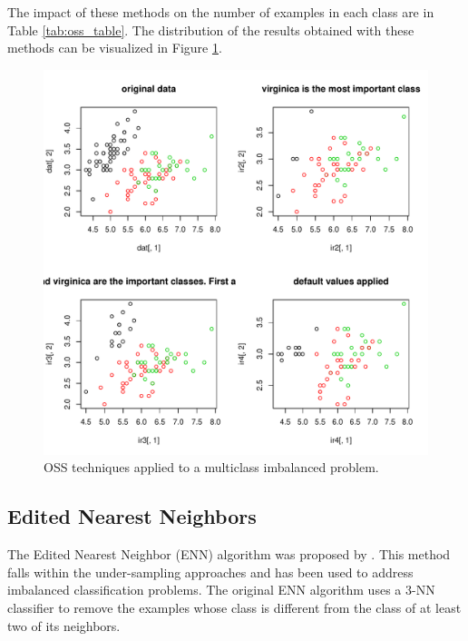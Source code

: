\documentclass[10pt,a4paper]{article}\usepackage[]{graphicx}\usepackage[]{color}
\makeatletter
\def\maxwidth{ %
  \ifdim\Gin@nat@width>\linewidth
    \linewidth
  \else
    \Gin@nat@width
  \fi
}
\newenvironment{knitrout}{}{} %
\makeatother
\begin{document}
The impact of these methods on the number of examples in each class are in Table \ref{tab:oss_table}. The distribution of the results obtained with these methods can be visualized in Figure \ref{fig:OSS_plot}.


\begin{knitrout}\footnotesize
{}\color{fgcolor}\begin{figure}

{\centering \includegraphics[width=\maxwidth]{figures/UBL-OSS_plot-1} 

}

\caption[OSS techniques applied to a multiclass imbalanced problem]{OSS techniques applied to a multiclass imbalanced problem.}\label{fig:OSS_plot}
\end{figure}


\end{knitrout}





\subsection{Edited Nearest Neighbors}\label{sec:ENN}

The Edited Nearest Neighbor (ENN) algorithm was proposed by \cite{wilson1972asymptotic}. This method falls within the under-sampling approaches and has been used to address imbalanced classification problems. The original ENN algorithm uses a 3-NN classifier to remove the examples whose class is different from the class of at least two of its neighbors. 
\end{document}
